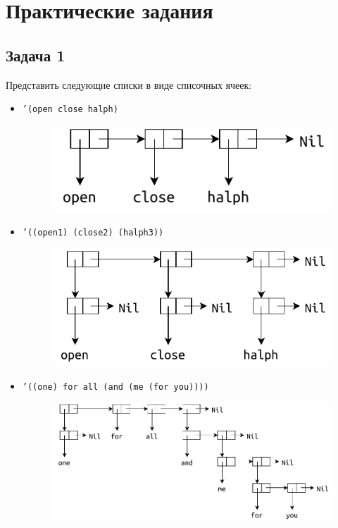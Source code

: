 \chapter{Практические задания}

\section{Задача 1}

Представить следующие списки в виде списочных ячеек:

\begin{itemize}
	\item \texttt{'(open close halph)}
	
	\begin{figure}[ht]
		\centering
		\includegraphics[scale=1]{img/1-1}
	\end{figure}
	
	\item \texttt{'((open1) (close2) (halph3))}
	
	\begin{figure}[ht]
		\centering
		\includegraphics[scale=1]{img/1-2}
	\end{figure}
	
	\item \texttt{'((one) for all (and (me (for you))))}
	
	\begin{figure}[ht]
		\centering
		\includegraphics[scale=1]{img/1-3}
	\end{figure}


\end{itemize}
